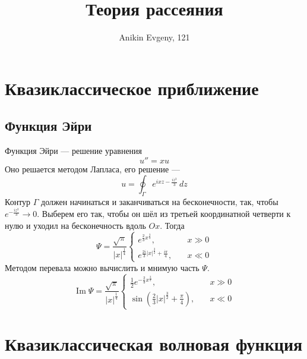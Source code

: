 \documentclass{article}
\title{Теория рассеяния}
\author{Anikin Evgeny, 121}
\begin{document}
\maketitle

\section{Квазиклассическое приближение}
\subsection{Функция Эйри}
Функция Эйри --- решение уравнения
\begin{equation}
	u'' = xu
\end{equation}
Оно решается методом Лапласа, его решение ---
\begin{equation}
	u = \oint_\Gamma e^{ixz - \frac{iz^3}{3}}\,dz
\end{equation}
Контур $\Gamma$ должен начинаться и заканчиваться на бесконечности, так, чтобы 
$e^{-\frac{iz^3}{3}} \to 0$. Выберем его так, чтобы он шёл из третьей координатной четверти
к нулю и уходил на бесконечность вдоль $Ox$. Тогда 
\begin{equation}
	\Psi = \frac{\sqrt{\pi}}{|x|^{\frac14}}\left\{ \begin{matrix}
			e^{\frac23 x^{\frac32}}, & \quad x \gg 0 \\
			e^{\frac{2i}{3} |x|^{\frac32} + \frac{i\pi}{4}}, & \quad x \ll 0
			\end{matrix} \right.
\end{equation}
Методом перевала можно вычислить и мнимую часть $\Psi$. 
\begin{equation}
	\operatorname{Im}\Psi = \frac{\sqrt{\pi}}{|x|^{\frac14}}\left\{ \begin{matrix}
			\frac12 e^{-\frac23 x^{\frac32}}, & \quad x \gg 0 \\
			\sin{\left(\frac{2}{3} |x|^{\frac32} + \frac{\pi}{4}\right)}, & \quad x \ll 0
			\end{matrix} \right.
\end{equation}
\section{Квазиклассическая волновая функция}
\end{document}

